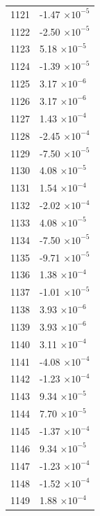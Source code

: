 \documentclass[a4paper,11pt]{article}
\begin{document}
\begin{center}
\begin{longtable}{|R{1.5cm}|R{2.5cm}|}
 1121 &        -1.47 $\times 10^{          -5}$ \\
 1122 &        -2.50 $\times 10^{          -5}$ \\
 1123 &         5.18 $\times 10^{          -5}$ \\
 1124 &        -1.39 $\times 10^{          -5}$ \\
 1125 &         3.17 $\times 10^{          -6}$ \\
 1126 &         3.17 $\times 10^{          -6}$ \\
 1127 &         1.43 $\times 10^{          -4}$ \\
 1128 &        -2.45 $\times 10^{          -4}$ \\
 1129 &        -7.50 $\times 10^{          -5}$ \\
 1130 &         4.08 $\times 10^{          -5}$ \\
 1131 &         1.54 $\times 10^{          -4}$ \\
 1132 &        -2.02 $\times 10^{          -4}$ \\
 1133 &         4.08 $\times 10^{          -5}$ \\
 1134 &        -7.50 $\times 10^{          -5}$ \\
 1135 &        -9.71 $\times 10^{          -5}$ \\
 1136 &         1.38 $\times 10^{          -4}$ \\
 1137 &        -1.01 $\times 10^{          -5}$ \\
 1138 &         3.93 $\times 10^{          -6}$ \\
 1139 &         3.93 $\times 10^{          -6}$ \\
 1140 &         3.11 $\times 10^{          -4}$ \\
 1141 &        -4.08 $\times 10^{          -4}$ \\
 1142 &        -1.23 $\times 10^{          -4}$ \\
 1143 &         9.34 $\times 10^{          -5}$ \\
 1144 &         7.70 $\times 10^{          -5}$ \\
 1145 &        -1.37 $\times 10^{          -4}$ \\
 1146 &         9.34 $\times 10^{          -5}$ \\
 1147 &        -1.23 $\times 10^{          -4}$ \\
 1148 &        -1.52 $\times 10^{          -4}$ \\
 1149 &         1.88 $\times 10^{          -4}$ \\

\end{longtable}
\end{center}
\end{document}
